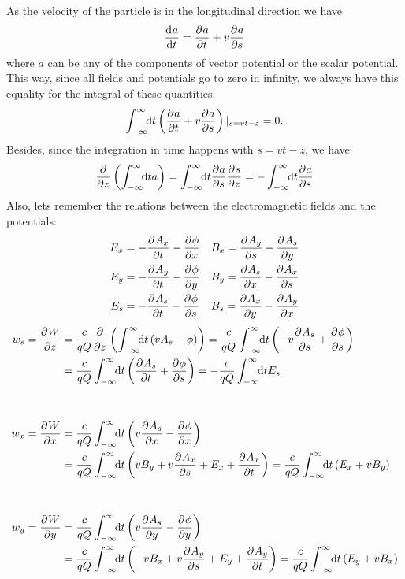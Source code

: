 \begin{apendicesenv}
    As the velocity of the particle is in the longitudinal direction we have
    \begin{align}
    	\frac{\mathrm{d}^{{}}a}{\mathrm{d} t^{{}}} = \frac{\partial^{{}}a}{\partial t^{{}}} + v\frac{\partial^{{}}a}{\partial s^{{}}}
    \end{align}
    where $a$ can be any of the components of vector potential or the scalar potential. This way, since all fields and potentials go to zero in infinity, we always have this equality for the integral of these quantities:
    \begin{align}
    	\int_{-\infty}^{\infty}\!\!\text{d}t \left(\frac{\partial^{{}}a}{\partial t^{{}}} + v\frac{\partial^{{}}a}{\partial s^{{}}}\right)|_{s=vt-z} = 0.
    \end{align}
    Besides, since the integration in time happens with $s=vt-z$, we have
    \begin{align}
    	\frac{\partial^{{}}}{\partial z^{{}}}\left(\int_{-\infty}^{\infty}\!\!\text{d}t a\right) =
    	\int_{-\infty}^{\infty}\!\!\text{d}t \frac{\partial^{{}}a}{\partial s^{{}}}\frac{\partial^{{}}s}{\partial z^{{}}} =
    	-\int_{-\infty}^{\infty}\!\!\text{d}t \frac{\partial^{{}}a}{\partial s^{{}}}
    \end{align}
    Also, lets remember the relations between the electromagnetic fields and the potentials:
    \begin{align}
    	E_x &= -\frac{\partial^{{}}A_x}{\partial t^{{}}} - \frac{\partial^{{}}\phi}{\partial x^{{}}} &
        	& B_x = \frac{\partial^{{}}A_y}{\partial s^{{}}} - \frac{\partial^{{}}A_s}{\partial y^{{}}}\\
    	E_y &= -\frac{\partial^{{}}A_y}{\partial t^{{}}} - \frac{\partial^{{}}\phi}{\partial y^{{}}} &
        	& B_y = \frac{\partial^{{}}A_s}{\partial x^{{}}} - \frac{\partial^{{}}A_x}{\partial s^{{}}}\\
    	E_s &= -\frac{\partial^{{}}A_s}{\partial t^{{}}} - \frac{\partial^{{}}\phi}{\partial s^{{}}} &
        	& B_s = \frac{\partial^{{}}A_x}{\partial y^{{}}} - \frac{\partial^{{}}A_y}{\partial x^{{}}}
    \end{align}
    \begin{align}
    	w_s = \derpar{W}{z}\nonumber
    	&= \frac{c}{qQ} \derpar{}{z}\left(\infint{t}{\left(vA_s-\phi\right)}\right)
    	= \frac{c}{qQ} \infint{t}{\left(-v\derpar{A_s}{s}+\derpar{\phi}{s}\right)}\\
    	&= \frac{c}{qQ} \infint{t}{\left(\derpar{A_s}{t}+\derpar{\phi}{s}\right)}
    	=-\frac{c}{qQ} \infint{t}{E_s}\\[1cm]
    	w_x = \derpar{W}{x}\nonumber
    	&=\frac{c}{qQ} \infint{t}{\left(v\derpar{A_s}{x}-\derpar{\phi}{x}\right)}\\
    	&= \frac{c}{qQ} \infint{t}{\left(vB_y+v\derpar{A_x}{s} + E_x + \derpar{A_x}{t}\right)}
    	= \frac{c}{qQ} \infint{t}{\left(E_x + vB_y\right)}\\[1cm]
    	w_y = \derpar{W}{y}\nonumber
    	&=\frac{c}{qQ} \infint{t}{\left(v\derpar{A_s}{y}-\derpar{\phi}{y}\right)}\\
    	&=\frac{c}{qQ} \infint{t}{\left(-vB_x+v\derpar{A_y}{s} + E_y + \derpar{A_y}{t}\right)}
    	= \frac{c}{qQ} \infint{t}{\left(E_y + vB_x\right)}
    \end{align}



\end{apendicesenv}
